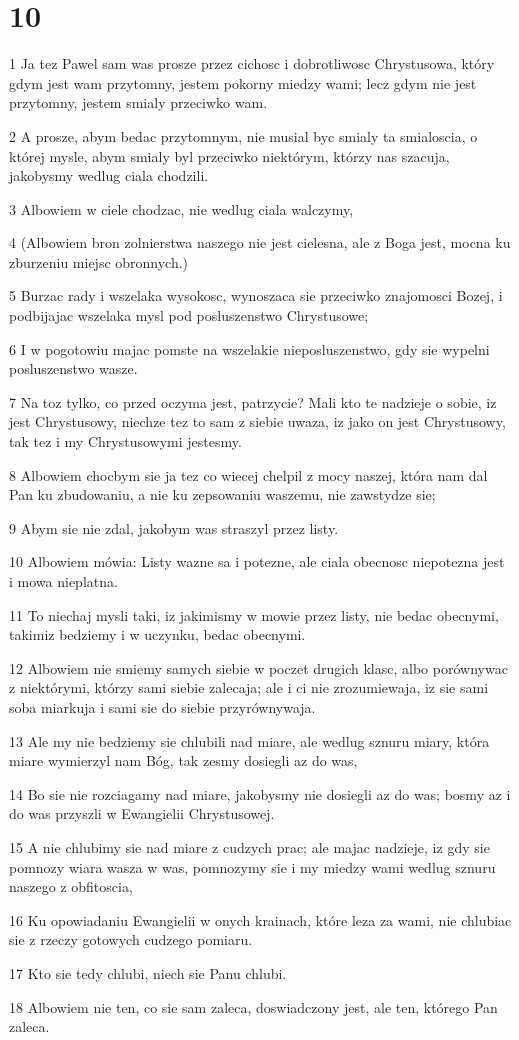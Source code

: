 \chapter{10}

\par 1 Ja tez Pawel sam was prosze przez cichosc i dobrotliwosc Chrystusowa, który gdym jest wam przytomny, jestem pokorny miedzy wami; lecz gdym nie jest przytomny, jestem smialy przeciwko wam.
\par 2 A prosze, abym bedac przytomnym, nie musial byc smialy ta smialoscia, o której mysle, abym smialy byl przeciwko niektórym, którzy nas szacuja, jakobysmy wedlug ciala chodzili.
\par 3 Albowiem w ciele chodzac, nie wedlug ciala walczymy,
\par 4 (Albowiem bron zolnierstwa naszego nie jest cielesna, ale z Boga jest, mocna ku zburzeniu miejsc obronnych.)
\par 5 Burzac rady i wszelaka wysokosc, wynoszaca sie przeciwko znajomosci Bozej, i podbijajac wszelaka mysl pod posluszenstwo Chrystusowe;
\par 6 I w pogotowiu majac pomste na wszelakie nieposluszenstwo, gdy sie wypelni posluszenstwo wasze.
\par 7 Na toz tylko, co przed oczyma jest, patrzycie? Mali kto te nadzieje o sobie, iz jest Chrystusowy, niechze tez to sam z siebie uwaza, iz jako on jest Chrystusowy, tak tez i my Chrystusowymi jestesmy.
\par 8 Albowiem chocbym sie ja tez co wiecej chelpil z mocy naszej, która nam dal Pan ku zbudowaniu, a nie ku zepsowaniu waszemu, nie zawstydze sie;
\par 9 Abym sie nie zdal, jakobym was straszyl przez listy.
\par 10 Albowiem mówia: Listy wazne sa i potezne, ale ciala obecnosc niepotezna jest i mowa nieplatna.
\par 11 To niechaj mysli taki, iz jakimismy w mowie przez listy, nie bedac obecnymi, takimiz bedziemy i w uczynku, bedac obecnymi.
\par 12 Albowiem nie smiemy samych siebie w poczet drugich klasc, albo porównywac z niektórymi, którzy sami siebie zalecaja; ale i ci nie zrozumiewaja, iz sie sami soba miarkuja i sami sie do siebie przyrównywaja.
\par 13 Ale my nie bedziemy sie chlubili nad miare, ale wedlug sznuru miary, która miare wymierzyl nam Bóg, tak zesmy dosiegli az do was,
\par 14 Bo sie nie rozciagamy nad miare, jakobysmy nie dosiegli az do was; bosmy az i do was przyszli w Ewangielii Chrystusowej.
\par 15 A nie chlubimy sie nad miare z cudzych prac; ale majac nadzieje, iz gdy sie pomnozy wiara wasza w was, pomnozymy sie i my miedzy wami wedlug sznuru naszego z obfitoscia,
\par 16 Ku opowiadaniu Ewangielii w onych krainach, które leza za wami, nie chlubiac sie z rzeczy gotowych cudzego pomiaru.
\par 17 Kto sie tedy chlubi, niech sie Panu chlubi.
\par 18 Albowiem nie ten, co sie sam zaleca, doswiadczony jest, ale ten, którego Pan zaleca.

